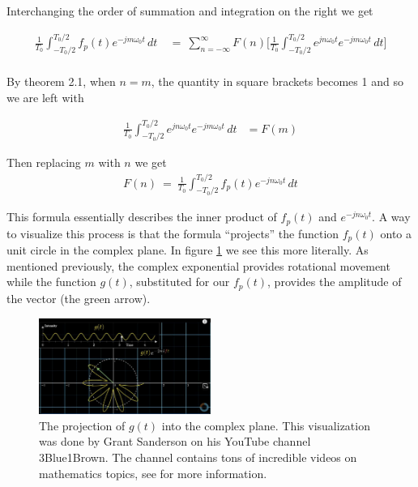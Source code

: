 \documentclass[10pt]{article}
\begin{document}
\noindent
Interchanging the order of summation and integration on the right we get

\begin{equation} \label{eq:2.23.1}
	\begin{aligned}
		\frac{1}{T_0}\int_{-T_0/2}^{T_0/2} f_p(t) e^{-jm\omega_0t} \,dt \: &= \: \sum_{n=-\infty}^{\infty} F(n) \Big[ \frac{1}{T_0}\int_{-T_0/2}^{T_0/2} e^{jn\omega_0t} e^{-jm\omega_0t} \,dt \Big] \\
	\end{aligned}
\end{equation}

\noindent
By theorem 2.1, when $n=m$, the quantity in square brackets becomes 1 and so we are left with

\begin{equation} \label{eq:2.23.2}
	\begin{aligned}
		\frac{1}{T_0}\int_{-T_0/2}^{T_0/2} e^{jn\omega_0t} e^{-jm\omega_0t} \,dt &= F(m)
	\end{aligned}
\end{equation}

\noindent
Then replacing $m$ with $n$ we get
\begin{equation} \label{eq:2.26}
\begin{aligned}
    F(n) \: = \: \frac{1}{T_0}\int_{-T_0/2}^{T_0/2} f_p(t) e^{-jn\omega_0t} \,dt
\end{aligned}
\end{equation}

\noindent \cite{morrison1994fourier}

This formula essentially describes the inner product of $f_p(t)$ and $e^{-jn\omega_0t}$. A way to visualize this process is that the formula ``projects'' the function $f_p(t)$ onto a unit circle in the complex plane. In figure \ref{fig:projection} we see this more literally. As mentioned previously, the complex exponential provides rotational movement while the function $g(t)$, substituted for our $f_p(t)$, provides the amplitude of the vector (the green arrow).

\begin{figure}[h]
    \centering
    \includegraphics[width=0.5\textwidth]{Projection_One.jpg}
    \caption{The projection of $g(t)$ into the complex plane. This visualization was done by Grant Sanderson on his YouTube channel 3Blue1Brown. The channel contains tons of incredible videos on mathematics topics, see \cite{3Blue1Brown} for more information.} 
    \label{fig:projection}
\end{figure}
\end{document}
